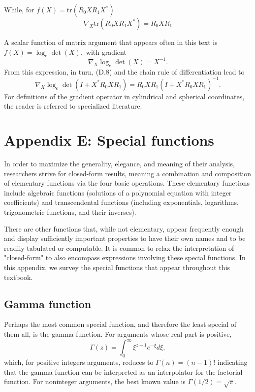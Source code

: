 \documentclass[a4paper, 12pt]{book}
\begin{document}
\begin{greenbox}[Example D.3]
While, for $f(X)=\text{tr}(R_{0}XR_{1}X^{*})$
\begin{equation}
    \nabla_{X}\text{tr}(R_{0}XR_{1}X^{*})=R_{0}XR_{1} \tag{D.8}
\end{equation}
\end{greenbox}

A scalar function of matrix argument that appears often in this text is $f(X)=\log_{e}\det(X),$ with gradient
\begin{equation}
    \nabla_{X}\log_{e}\det(X)=X^{-1}. \tag{D.9}
\end{equation}
From this expression, in turn, (D.8) and the chain rule of differentiation lead to
\begin{equation}
    \nabla_{X}\log_{e}\det(I+X^{*}R_{0}XR_{1})=R_{0}XR_{1}(I+X^{*}R_{0}XR_{1})^{-1}. \tag{D.10}
\end{equation}
For definitions of the gradient operator in cylindrical and spherical coordinates, the reader is referred to specialized literature.

\setcounter{chapter}{5}
\setcounter{section}{0}
\chapter*{Appendix E: Special functions}

In order to maximize the generality, elegance, and meaning of their analysis, researchers strive for closed-form results, meaning a combination and composition of elementary functions via the four basic operations. These elementary functions include algebraic functions (solutions of a polynomial equation with integer coefficients) and transcendental functions (including exponentials, logarithms, trigonometric functions, and their inverses).

There are other functions that, while not elementary, appear frequently enough and display sufficiently important properties to have their own names and to be readily tabulated or computable. It is common to relax the interpretation of "closed-form" to also encompass expressions involving these special functions. In this appendix, we survey the special functions that appear throughout this textbook.

\section{Gamma function}
Perhaps the most common special function, and therefore the least special of them all, is the gamma function. For arguments whose real part is positive,
\begin{equation}
    \Gamma(z)=\int_{0}^{\infty}\xi^{z-1}e^{-\xi}d\xi, \tag{E.1}
\end{equation}
which, for positive integers arguments, reduces to $\Gamma(n)=(n-1)!$ indicating that the gamma function can be interpreted as an interpolator for the factorial function. For noninteger arguments, the best known value is $\Gamma(1/2)=\sqrt{\pi}$.
\end{document}
